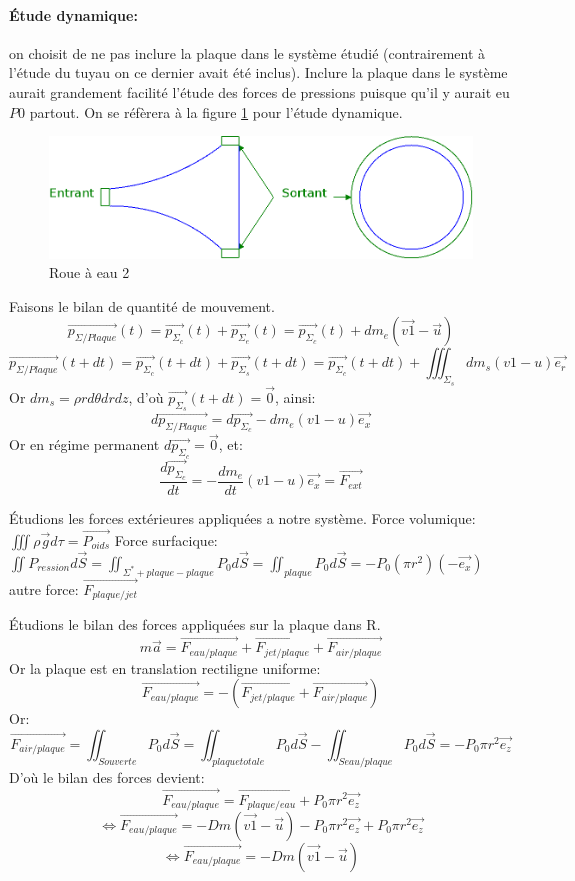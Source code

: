 \documentclass[10pt,a4paper]{article}
\begin{document}
\paragraph{Étude dynamique:} on choisit de ne pas inclure la plaque dans le système étudié (contrairement à l'étude du tuyau on ce dernier avait été inclus). Inclure la plaque dans le système aurait grandement facilité l'étude des forces de pressions puisque qu'il y aurait eu $P0$ partout. On se réfèrera à la figure \ref{fig:roue2} pour l'étude dynamique.
\begin{figure}
\centering
\includegraphics[scale=0.30]{roue2}
\caption{Roue à eau 2}
\label{fig:roue2}
\end{figure}
Faisons le bilan de quantité de mouvement.
\[ \vec{p_{\Sigma / Plaque}}(t) = \vec{p_{\Sigma_{c}}}(t) + \vec{p_{\Sigma_{e}}}(t) = \vec{p_{\Sigma_{c}}}(t) + dm_{e}(\vec{v1} - \vec{u}) \]
\[ \vec{p_{\Sigma / Plaque}}(t+dt) = \vec{p_{\Sigma_{c}}}(t+dt) + \vec{p_{\Sigma_{s}}}(t+dt) = \vec{p_{\Sigma_{c}}}(t+dt) + \iiint_{\Sigma_{s}}dm_{s}(v1 - u)\vec{e_{r}}\]
Or $dm_{s} = \rho rd\theta drdz$, d'où $\vec{p_{\Sigma_{s}}}(t+dt) = \vec{0}$, ainsi:
\[d\vec{p_{\Sigma / Plaque}} = d\vec{p_{\Sigma_{c}}} - dm_{e}(v1-u)\vec{e_{x}}\]
Or en régime permanent $d\vec{p_{\Sigma_{c}}} = \vec{0}$, et:
\[ \frac{d\vec{p_{\Sigma_{c}}}}{dt} = -\frac{dm_{e}}{dt}(v1 - u)\vec{e_{x}} = \vec{F_{ext}}  \]

Étudions les forces extérieures appliquées a notre système.\newline
Force volumique: $\iiint \rho\vec{g}d\tau = \vec{P_{oids}}$\newline
Force surfacique: $\iint P_{ression}d\vec{S} = \iint_{\Sigma^{*} + plaque - plaque}P_{0}d\vec{S} = \iint_{plaque}P_{0}d\vec{S} = -P_{0}(\pi r^{2})(-\vec{e_{x}})$\newline
autre force: $\vec{F_{plaque / jet}}$

Étudions le bilan des forces appliquées sur la plaque dans R.
\[m\vec{a} = \vec{F_{eau / plaque}} + \vec{F_{jet / plaque}} + \vec{F_{air / plaque}}\]
Or la plaque est en translation rectiligne uniforme:
\[ \vec{F_{eau / plaque}} = - (\vec{F_{jet / plaque}} + \vec{F_{air / plaque}}) \]
Or:
\[\vec{F_{air / plaque}} = \iint_{S ouverte}P_{0}d\vec{S} = \iint_{plaque totale}P_{0}d\vec{S} - \iint_{S eau / plaque}P_{0}d\vec{S} = -P_{0}\pi r^{2}\vec{e_{z}}\]
D'où le bilan des forces devient:
\[\vec{F_{eau / plaque}} = \vec{F_{plaque / eau}} + P_{0}\pi r^{2}\vec{e_{z}}\]
\[\iff \vec{F_{eau / plaque}}  = - Dm(\vec{v1} - \vec{u}) - P_{0}\pi r^{2}\vec{e_{z}} + P_{0}\pi r^{2}\vec{e_{z}} \]
\[\iff \vec{F_{eau / plaque}} = - Dm(\vec{v1} - \vec{u})\]
\end{document}
